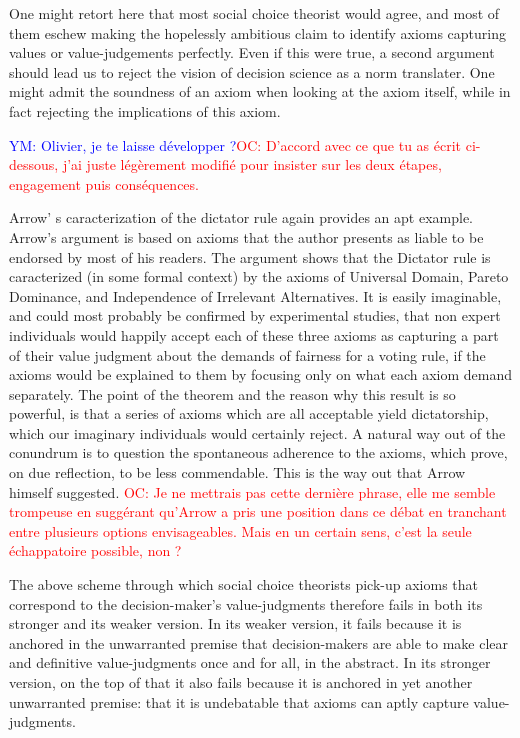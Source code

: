 \documentclass[preprint, french, english, 11pt]{elsarticle}%
\newcommand{\commentYM}[1]{\textcolor{blue}{YM: #1}}
\newcommand{\commentOC}[1]{\textcolor{red}{OC: #1}}
\begin{document}
One might retort here that most social choice theorist would agree, and most of them eschew making the hopelessly ambitious claim to identify axioms capturing values or value-judgements perfectly. Even if this were true, a second argument should lead us to reject the vision of decision science as a norm translater. One might admit the soundness of an axiom when looking at the axiom itself, while in fact rejecting the implications of this axiom.

\commentYM{Olivier, je te laisse développer ?}\commentOC{D’accord avec ce que tu as écrit ci-dessous, j’ai juste légèrement modifié pour insister sur les deux étapes, engagement puis conséquences.}

Arrow' s  caracterization of the dictator rule \cite{arrow_social_2012} again provides an apt example. Arrow's argument is based on axioms that the author presents as liable to be endorsed by most of his readers. The argument shows that the Dictator rule is caracterized (in some formal context) by the axioms of Universal Domain, Pareto Dominance, and Independence of Irrelevant Alternatives. It is easily imaginable, and could most probably be confirmed by experimental studies, that non expert individuals would happily accept each of these three axioms as capturing a part of their value judgment about the demands of fairness for a voting rule, if the axioms would be explained to them by focusing only on what each axiom demand separately. The point of the theorem and the reason why this result is so powerful, is that a series of axioms which are all acceptable yield dictatorship, which our imaginary individuals would certainly reject. A natural way out of the conundrum is to question the spontaneous adherence to the axioms, which prove, on due reflection, to be less commendable. This is the way out that Arrow himself suggested. \commentOC{Je ne mettrais pas cette dernière phrase, elle me semble trompeuse en suggérant qu’Arrow a pris une position dans ce débat en tranchant entre plusieurs options envisageables. Mais en un certain sens, c’est la seule échappatoire possible, non ?}


The above scheme through which social choice theorists pick-up axioms that correspond to the decision-maker's value-judgments therefore fails in both its stronger and its weaker version. In its weaker version, it fails because it is anchored in the unwarranted premise that decision-makers are able to make clear and definitive value-judgments once and for all, in the abstract. In its stronger version, on the top of that it also fails because it is anchored in yet another unwarranted premise: that it is undebatable that axioms can aptly capture value-judgments.
\end{document}
